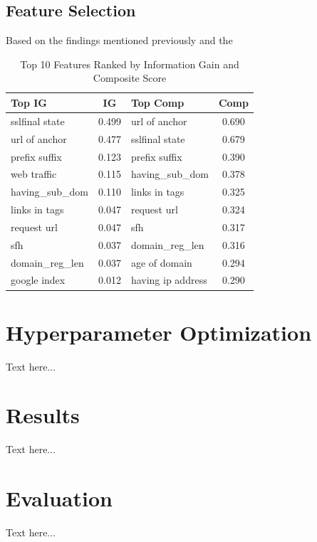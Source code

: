 \documentclass{sigkddExp}
\begin{document}
\subsection{Feature Selection}
Based on the findings mentioned previously and the 
\begin{table}[h!]
\centering
\begin{tabular}{|p{2.5cm}|c|p{2.5cm}|c|}
\hline
\textbf{Top IG} & \textbf{IG} & \textbf{Top Comp} & \textbf{Comp} \\ \hline
sslfinal state             & 0.499  & url of anchor               & 0.690 \\ \hline
url of anchor              & 0.477  & sslfinal state              & 0.679 \\ \hline
prefix suffix              & 0.123  & prefix suffix               & 0.390 \\ \hline
web traffic                & 0.115  & having\_sub\_dom           & 0.378 \\ \hline
having\_sub\_dom          & 0.110  & links in tags               & 0.325 \\ \hline
links in tags              & 0.047 & request url                 & 0.324 \\ \hline
request url                & 0.047 & sfh                         & 0.317 \\ \hline
sfh                        & 0.037 & domain\_reg\_len  & 0.316 \\ \hline
domain\_reg\_len & 0.037 & age of domain               & 0.294 \\ \hline
google index              & 0.012  & having ip address           & 0.290 \\ \hline
\end{tabular}
\caption{Top 10 Features Ranked by Information Gain and Composite Score}
\label{table:feature_ranking}
\end{table}
 
\section{Hyperparameter Optimization}
Text here...

\section{Results}
Text here...

\section{Evaluation}
Text here...
\end{document}
